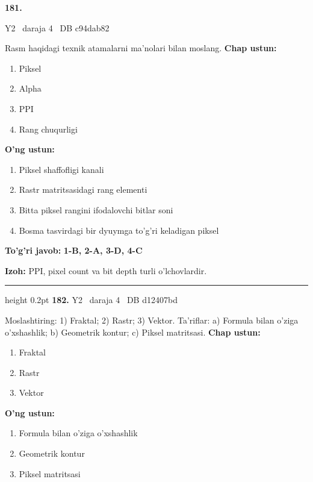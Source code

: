 \documentclass[10pt,a4paper,oneside]{article}
\begin{document}
\hypertarget{q181}{\textbf{\color{ink}181.}}  {\color{muted}\scriptsize Y2 \textbullet\ daraja 4 \textbullet\ DB c94dab82}
\par
Rasm haqidagi texnik atamalarni ma'nolari bilan moslang.
\textbf{\footnotesize Chap ustun:}
\begin{enumerate}[label=\arabic*),leftmargin=9mm]
\item Piksel
\item Alpha
\item PPI
\item Rang chuqurligi
\end{enumerate}
\textbf{\footnotesize O'ng ustun:}
\begin{enumerate}[label=\Alph*),leftmargin=9mm]
\item Piksel shaffofligi kanali
\item Rastr matritsasidagi rang elementi
\item Bitta piksel rangini ifodalovchi bitlar soni
\item Bosma tasvirdagi bir dyuymga to'g'ri keladigan piksel
\end{enumerate}
\begin{tcolorbox}[enhanced,breakable,colback=teal!4,colframe=teal!45!black,boxrule=0.45pt,arc=1.2mm,left=2.8mm,right=2.8mm,top=2mm,bottom=2mm,before skip=2mm,after skip=2mm]
\textbf{\color{teal}To'g'ri javob:} \textbf{1-B, 2-A, 3-D, 4-C}
\par\smallskip
\textbf{Izoh:} PPI, pixel count va bit depth turli o'lchovlardir.
\end{tcolorbox}
\vspace{2mm}\hrule height 0.2pt \vspace{4mm}
\hypertarget{q182}{\textbf{\color{ink}182.}}  {\color{muted}\scriptsize Y2 \textbullet\ daraja 4 \textbullet\ DB d12407bd}
\par
Moslashtiring: 1) Fraktal; 2) Rastr; 3) Vektor. Ta'riflar: a) Formula bilan o'ziga o'xshashlik; b) Geometrik kontur; c) Piksel matritsasi.
\textbf{\footnotesize Chap ustun:}
\begin{enumerate}[label=\arabic*),leftmargin=9mm]
\item Fraktal
\item Rastr
\item Vektor
\end{enumerate}
\textbf{\footnotesize O'ng ustun:}
\begin{enumerate}[label=\Alph*),leftmargin=9mm]
\item Formula bilan o'ziga o'xshashlik
\item Geometrik kontur
\item Piksel matritsasi
\end{enumerate}
\end{document}
